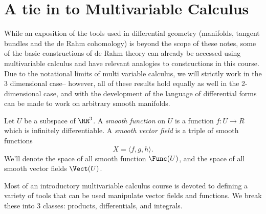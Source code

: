 
\section{A tie in to Multivariable Calculus}
While an exposition of the tools used in differential geometry (manifolds, tangent bundles and the de Rahm cohomology) is beyond the scope of these notes, some of the basic constructions of de Rahm theory can already be accessed using multivariable calculus and have relevant analogies to constructions in this course.\\
Due to the notational limits of multi variable calculus, we will strictly work in the 3 dimensional case-- however, all of these results hold equally as well in the 2-dimensional case, and with the development of the language of differential forms can be made to work on arbitrary smooth manifolds. 
\begin{definition}
	Let $U$ be a subspace of $\RR^3$. A \emph{smooth function} on $U$ is a function $f: U\to R$ which is infinitely differentiable. A \emph{smooth vector field} is a triple of smooth functions 
	\[X=\langle f, g, h\rangle.\]
	We'll denote the space of all smooth function $\Func(U)$, and the space of all smooth vector fields $\Vect(U)$. 
\end{definition}
Most of an introductory multivariable calculus course is devoted to defining a variety of tools that can be used manipulate vector fields and functions. We break these into 3 classes: products, differentials, and integrals. 

